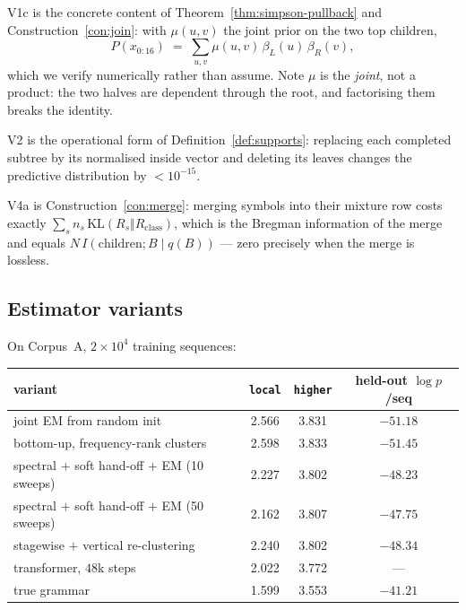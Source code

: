 \noindent
V1c is the concrete content of Theorem~\ref{thm:simpson-pullback} and
Construction~\ref{con:join}: with $\mu(u,v)$ the joint prior on the two top
children,
\begin{equation}
  P(x_{0:16}) \;=\; \sum_{u,v} \mu(u,v)\, \beta_L(u)\, \beta_R(v),
  \label{eq:glue}
\end{equation}
which we verify numerically rather than assume. Note $\mu$ is the \emph{joint},
not a product: the two halves are dependent through the root, and factorising
them breaks the identity.

V2 is the operational form of Definition~\ref{def:supports}: replacing each
completed subtree by its normalised inside vector and deleting its leaves
changes the predictive distribution by $<10^{-15}$.

V4a is Construction~\ref{con:merge}: merging symbols into their mixture row
costs exactly $\sum_s n_s\,\mathrm{KL}(R_s \Vert R_{\mathrm{class}})$, which is
the Bregman information of the merge and equals $N\,I(\text{children};B\mid
q(B))$ --- zero precisely when the merge is lossless.

\subsection{Estimator variants}

On Corpus~A, $2\times10^4$ training sequences:

\begin{center}
\begin{tabular}{lccc}
\toprule
variant & \texttt{local} & \texttt{higher} & held-out $\log p$/seq \\
\midrule
joint EM from random init      & 2.566 & 3.831 & $-51.18$ \\
bottom-up, frequency-rank clusters & 2.598 & 3.833 & $-51.45$ \\
spectral $+$ soft hand-off $+$ EM (10 sweeps) & 2.227 & 3.802 & $-48.23$ \\
spectral $+$ soft hand-off $+$ EM (50 sweeps) & 2.162 & 3.807 & $-47.75$ \\
stagewise $+$ vertical re-clustering & 2.240 & 3.802 & $-48.34$ \\
\midrule
transformer, $48$k steps        & 2.022 & 3.772 & --- \\
true grammar                    & 1.599 & 3.553 & $-41.21$ \\
\bottomrule
\end{tabular}
\end{center}

